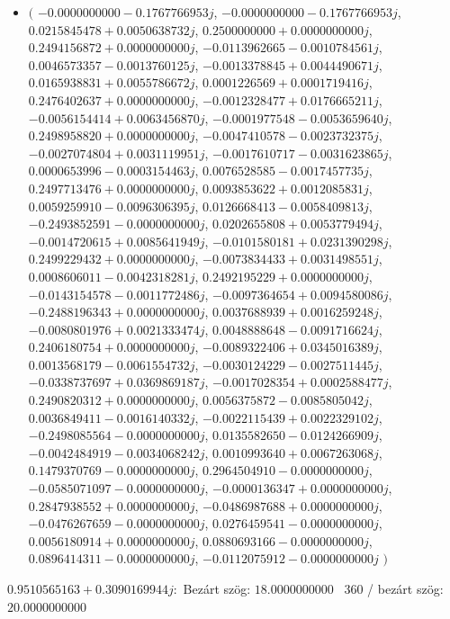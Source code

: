 \documentclass[14pt,a4paper]{article}
\begin{document}
\begin{itemize}
\item
$\big($
$-0.0000000000-0.1767766953j$, $-0.0000000000-0.1767766953j$, $0.0215845478+0.0050638732j$, $0.2500000000+0.0000000000j$, $0.2494156872+0.0000000000j$, $-0.0113962665-0.0010784561j$, $0.0046573357-0.0013760125j$, $-0.0013378845+0.0044490671j$, $0.0165938831+0.0055786672j$, $0.0001226569+0.0001719416j$, $0.2476402637+0.0000000000j$, $-0.0012328477+0.0176665211j$, $-0.0056154414+0.0063456870j$, $-0.0001977548-0.0053659640j$, $0.2498958820+0.0000000000j$, $-0.0047410578-0.0023732375j$, $-0.0027074804+0.0031119951j$, $-0.0017610717-0.0031623865j$, $0.0000653996-0.0003154463j$, $0.0076528585-0.0017457735j$, $0.2497713476+0.0000000000j$, $0.0093853622+0.0012085831j$, $0.0059259910-0.0096306395j$, $0.0126668413-0.0058409813j$, $-0.2493852591-0.0000000000j$, $0.0202655808+0.0053779494j$, $-0.0014720615+0.0085641949j$, $-0.0101580181+0.0231390298j$, $0.2499229432+0.0000000000j$, $-0.0073834433+0.0031498551j$, $0.0008606011-0.0042318281j$, $0.2492195229+0.0000000000j$, $-0.0143154578-0.0011772486j$, $-0.0097364654+0.0094580086j$, $-0.2488196343+0.0000000000j$, $0.0037688939+0.0016259248j$, $-0.0080801976+0.0021333474j$, $0.0048888648-0.0091716624j$, $0.2406180754+0.0000000000j$, $-0.0089322406+0.0345016389j$, $0.0013568179-0.0061554732j$, $-0.0030124229-0.0027511445j$, $-0.0338737697+0.0369869187j$, $-0.0017028354+0.0002588477j$, $0.2490820312+0.0000000000j$, $0.0056375872-0.0085805042j$, $0.0036849411-0.0016140332j$, $-0.0022115439+0.0022329102j$, $-0.2498085564-0.0000000000j$, $0.0135582650-0.0124266909j$, $-0.0042484919-0.0034068242j$, $0.0010993640+0.0067263068j$, $0.1479370769-0.0000000000j$, $0.2964504910-0.0000000000j$, $-0.0585071097-0.0000000000j$, $-0.0000136347+0.0000000000j$, $0.2847938552+0.0000000000j$, $-0.0486987688+0.0000000000j$, $-0.0476267659-0.0000000000j$, $0.0276459541-0.0000000000j$, $0.0056180914+0.0000000000j$, $0.0880693166-0.0000000000j$, $0.0896414311-0.0000000000j$, $-0.0112075912-0.0000000000j$
$\big)$
\end{itemize}
$0.9510565163+0.3090169944j$:\
Bezárt szög: $18.0000000000$ \
360 / bezárt szög: $20.0000000000$\
\end{document}
